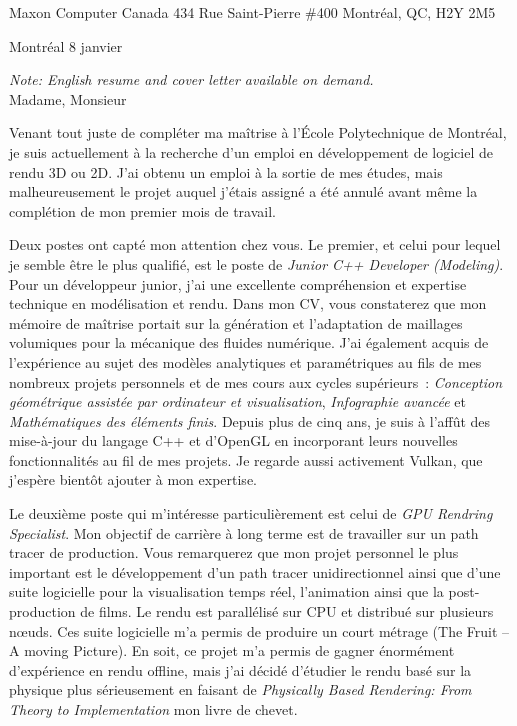 \insertcvheader

\clurecipient
 {Maxon Computer Canada}
 {434 Rue Saint-Pierre \#400}
 {Montréal, QC, H2Y 2M5}
 
\cllocationdate
 {Montréal}
 {8 janvier}
 
\textit{Note: English resume and cover letter available on demand.}\\
 
\clgreeting
 {Madame, Monsieur}
 
Venant tout juste de compléter ma maîtrise à l’École Polytechnique de Montréal, je suis actuellement à la recherche d’un emploi en développement de logiciel de rendu 3D ou 2D. J'ai obtenu un emploi à la sortie de mes études, mais malheureusement le projet auquel j'étais assigné a été annulé avant même la complétion de mon premier mois de travail.

Deux postes ont capté mon attention chez vous. Le premier, et celui pour lequel je semble être le plus qualifié, est le poste de \textit{Junior C++ Developer (Modeling)}. Pour un développeur junior, j'ai une excellente compréhension et expertise technique en modélisation et rendu. Dans mon CV, vous constaterez que mon mémoire de maîtrise portait sur la génération et l'adaptation de maillages volumiques pour la mécanique des fluides numérique. J'ai également acquis de l'expérience au sujet des modèles analytiques et paramétriques au fils de mes nombreux projets personnels et de mes cours aux cycles supérieurs~: \textit{Conception géométrique assistée par ordinateur et visualisation}, \textit{Infographie avancée} et \textit{Mathématiques des éléments finis}. Depuis plus de cinq ans, je suis à l'affût des mise-à-jour du langage C++ et d'OpenGL en incorporant leurs nouvelles fonctionnalités au fil de mes projets. Je regarde aussi activement Vulkan, que j'espère bientôt ajouter à mon expertise. 

Le deuxième poste qui m'intéresse particulièrement est celui de \textit{GPU Rendring Specialist}. Mon objectif de carrière à long terme est de travailler sur un path tracer de production. Vous remarquerez que mon projet personnel le plus important est le développement d'un path tracer unidirectionnel ainsi que d'une suite logicielle pour la visualisation temps réel, l'animation ainsi que la post-production de films. Le rendu est parallélisé sur CPU et distribué sur plusieurs nœuds. Ces suite logicielle m'a permis de produire un court métrage (The Fruit -- A moving Picture). En soit, ce projet m'a permis de gagner énormément d'expérience en rendu offline, mais j'ai décidé d'étudier le rendu basé sur la physique plus sérieusement en faisant de \textit{Physically Based Rendering: From Theory to Implementation} mon livre de chevet.
 
